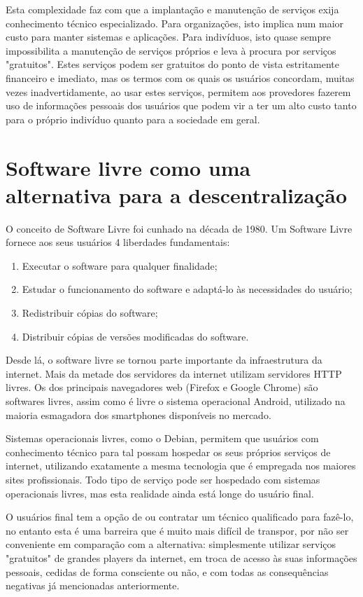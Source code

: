 \begin{anexosenv}
Esta complexidade faz com que a implantação e manutenção de serviços exija
conhecimento técnico especializado. Para organizações, isto implica num maior
custo para manter sistemas e aplicações. Para indivíduos, isto quase sempre
impossibilita a manutenção de serviços próprios e leva à procura por serviços
"gratuitos". Estes serviços podem ser gratuitos do ponto de vista estritamente
financeiro e imediato, mas os termos com os quais os usuários concordam, muitas
vezes inadvertidamente, ao usar estes serviços, permitem aos provedores fazerem
uso de informações pessoais dos usuários que podem vir a ter um alto custo
tanto para o próprio indivíduo quanto para a sociedade em geral.

\section{Software livre como uma alternativa para a descentralização}

O conceito de Software Livre foi cunhado na década de 1980. Um Software Livre
fornece aos seus usuários 4 liberdades fundamentais:

\begin{enumerate}
  \item Executar o software para qualquer finalidade;
  \item Estudar o funcionamento do software e adaptá-lo às necessidades do usuário;
  \item Redistribuir cópias do software; 
  \item Distribuir cópias de versões modificadas do software. 
\end{enumerate}

Desde lá, o software livre se tornou parte importante da infraestrutura da
internet. Mais da metade dos servidores da internet utilizam servidores
HTTP livres. Os dos principais navegadores web (Firefox e Google Chrome) são
softwares livres, assim como é livre o sistema operacional Android, utilizado
na maioria esmagadora dos smartphones disponíveis no mercado.

Sistemas operacionais livres, como o Debian, permitem que usuários com conhecimento
técnico para tal possam hospedar os seus próprios serviços de internet,
utilizando exatamente a mesma tecnologia que é empregada nos maiores sites
profissionais.  Todo tipo de serviço pode ser hospedado com sistemas
operacionais livres, mas esta realidade ainda está longe do usuário final.

O usuários final tem a opção de ou contratar um técnico qualificado para
fazê-lo, no entanto esta é uma barreira que é muito mais difícil de transpor,
por não ser conveniente em comparação com a alternativa: simplesmente utilizar
serviços "gratuitos" de grandes players da internet, em troca de acesso às
suas informações pessoais, cedidas de forma consciente ou não, e com todas as
consequências negativas já mencionadas anteriormente.


\end{anexosenv}

